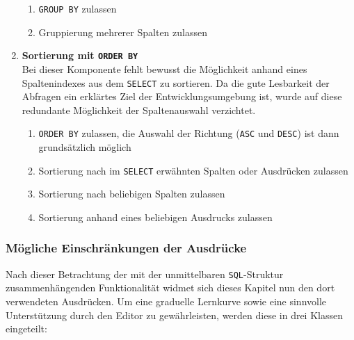 \begin{enumerate}
  \begin{enumerate}[noitemsep]
  \item \label{feat:group-allow} \texttt{GROUP BY} zulassen
  \item \label{feat:group-multiple} Gruppierung mehrerer Spalten zulassen
  \end{enumerate}
\item \textbf{Sortierung mit \texttt{ORDER BY}} \\
  Bei dieser Komponente fehlt bewusst die Möglichkeit anhand eines Spaltenindexes aus dem \texttt{SELECT} zu sortieren. Da die gute Lesbarkeit der Abfragen ein erklärtes Ziel der Entwicklungsumgebung ist, wurde auf diese redundante Möglichkeit der Spaltenauswahl verzichtet.
  \begin{enumerate}[noitemsep]
  \item \label{feat:order-allow} \texttt{ORDER BY} zulassen, die Auswahl der Richtung (\texttt{ASC} und \texttt{DESC}) ist dann grundsätzlich möglich
  \item \label{feat:order-select} Sortierung nach im \texttt{SELECT} erwähnten Spalten oder Ausdrücken zulassen
  \item \label{feat:order-any-column} Sortierung nach beliebigen Spalten zulassen
  \item \label{feat:order-expression} Sortierung anhand eines beliebigen Ausdrucks zulassen
  \end{enumerate}
\end{enumerate}

\subsubsection{Mögliche Einschränkungen der Ausdrücke}
\label{sec:sql-subset-expression}

Nach dieser Betrachtung der mit der unmittelbaren \texttt{SQL}-Struktur zusammenhängenden Funktionalität widmet sich dieses Kapitel nun den dort verwendeten Ausdrücken. Um eine graduelle Lernkurve sowie eine sinnvolle Unterstützung durch den Editor zu gewährleisten, werden diese in drei Klassen eingeteilt:

